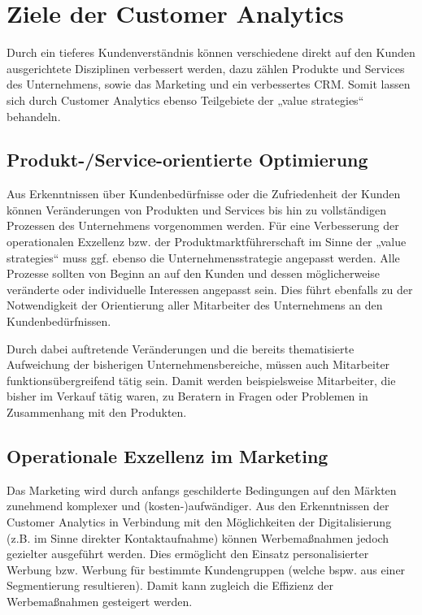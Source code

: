 \section{Ziele der Customer Analytics}
\label{sec:ziele}

Durch ein tieferes Kundenverständnis können verschiedene direkt auf den Kunden ausgerichtete Disziplinen verbessert werden, dazu zählen Produkte und Services des Unternehmens, sowie das Marketing und ein verbessertes CRM. Somit lassen sich durch Customer Analytics ebenso Teilgebiete der „value strategies“ behandeln.

\subsection{Produkt-/Service-orientierte Optimierung}
Aus Erkenntnissen über Kundenbedürfnisse oder die Zufriedenheit der Kunden können Veränderungen von Produkten und Services bis hin zu vollständigen Prozessen des Unternehmens vorgenommen werden. Für eine Verbesserung der operationalen Exzellenz bzw. der Produktmarktführerschaft im Sinne der „value strategies“ muss ggf. ebenso die Unternehmensstrategie angepasst werden. Alle Prozesse sollten von Beginn an auf den Kunden und dessen möglicherweise veränderte oder individuelle Interessen angepasst sein.
Dies führt ebenfalls zu der Notwendigkeit der Orientierung aller Mitarbeiter des Unternehmens an den Kundenbedürfnissen. \cite{habryn2012}

Durch dabei auftretende Veränderungen und die bereits thematisierte Aufweichung der bisherigen Unternehmensbereiche, müssen auch Mitarbeiter funktionsübergreifend tätig sein.
Damit werden beispielsweise Mitarbeiter, die bisher im Verkauf tätig waren, zu Beratern in Fragen oder Problemen in Zusammenhang mit den Produkten.

\subsection{Operationale Exzellenz im Marketing}
Das Marketing wird durch anfangs geschilderte Bedingungen auf den Märkten zunehmend komplexer und (kosten-)aufwändiger. Aus den Erkenntnissen der Customer Analytics in Verbindung mit den Möglichkeiten der Digitalisierung (z.B. im Sinne direkter Kontaktaufnahme) können Werbemaßnahmen jedoch gezielter ausgeführt werden. Dies ermöglicht den Einsatz personalisierter Werbung bzw. Werbung für bestimmte Kundengruppen (welche bspw. aus einer Segmentierung resultieren). Damit kann zugleich die Effizienz der Werbemaßnahmen gesteigert werden.

